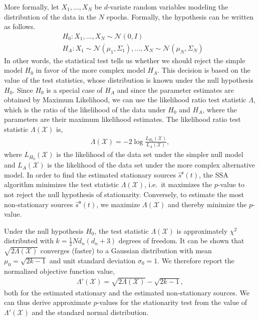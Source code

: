 \documentclass{article}
\newcommand{\1}{\ensuremath{\mathds{1}}}
\newcommand{\s}{\ensuremath{\mathfrak{s}}}
\newcommand{\n}{\ensuremath{\mathfrak{n}}}
\newcommand{\0}{\ensuremath{0}}
\begin{document}
\begin{appendices}
More formally, let $X_1, \ldots, X_N$ be $d$-variate random variables
modeling the distribution of the data in the $N$ epochs. Formally, the hypothesis can 
be written as follows.
\begin{align*}
	& H_0 : X_1, \ldots, X_N \sim \mathcal{N}(0, I) \\
	& H_A : X_1 \sim \mathcal{N}(\mu_1, \Sigma_1), \ldots, X_N \sim \mathcal{N}(\mu_N, \Sigma_N)
\end{align*}
In other words, the statistical test tells us whether we 
should reject the simple model $H_0$ in favor of the more complex model $H_A$. This decision 
is based on the value of the test statistics, whose distribution is known under the null hypothesis 
$H_0$. Since $H_0$ is a special case of $H_A$ and since the parameter estimates are obtained by 
Maximum Likelihood, we can use the likelihood ratio test statistic $\Lambda$,
which is the ratio of the likelihood of the data under $H_0$ and $H_A$, where the parameters are
their maximum likelihood estimates. 
The likelihood ratio test statistic $\Lambda(\mathcal{X})$ is, 
\begin{align} 
\label{eq:teststat}
  \Lambda(\mathcal{X}) = -2 \log \frac{L_{H_0}(\mathcal{X})}{ L_A(\mathcal{X})},
\end{align}
where $L_{H_0}(\mathcal{X})$ is the likelihood of the data set under the simpler null model and 
$L_A(\mathcal{X})$ is the likelihood of the data set under the more complex alternative model. In order
to find the estimated stationary sources $\hat{s}^\s(t)$, the SSA algorithm minimizes the test 
statistic $\Lambda(\mathcal{X})$, i.e.~it maximizes the $p$-value to not reject the null 
hypothesis of stationarity. Conversely, to estimate the most non-stationary sources  
$\hat{s}^\n(t)$, we maximize $\Lambda(\mathcal{X})$ and thereby minimize the $p$-value.

Under the null hypothesis $H_0$, the test statistic $\Lambda(\mathcal{X})$ is approximately $\chi^2$ distributed with 
$k = \frac{1}{2} N d_n (d_n+3)$ degrees of freedom. It can be shown that 
$\sqrt{2 \Lambda(\mathcal{X})}$ converges (faster) to a Gaussian distribution 
with mean $\mu_0 = \sqrt{2 k - 1}$ and unit standard deviation $\sigma_0 = 1$. We therefore
report the normalized objective function value, 
\begin{align*}
	\Lambda'(\mathcal{X}) = \sqrt{2 \Lambda(\mathcal{X})} - \sqrt{2 k - 1}, 
\end{align*}
both for the estimated stationary and the estimated non-stationary sources. We can thus 
derive approximate $p$-values for the stationarity test from the value of $\Lambda'(\mathcal{X})$ 
and the standard normal distribution. 


\end{appendices}
\end{document}
